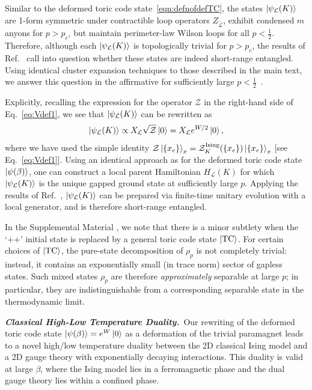 \documentclass[aps,prl,twocolumn,floatfix,nofootinbib]{revtex4-2}
\theoremstyle{definition}
\newcommand{\TC}{\text{TC}}
\begin{document}
Similar to the deformed toric code state~\eqref{eqn:defnofdefTC}, the states $\ket{\psi_{\mathcal{L}}(K)}$ are 1-form symmetric under contractible loop operators $Z_{\tilde{\mathcal{L}}}$, exhibit condensed $m$ anyons for $p > p_{c}$, but maintain perimeter-law Wilson loops for all $p < \frac{1}{2}$. Therefore, although each $\ket{\psi_{\mathcal{L}}(K)}$ is topologically trivial for $p > p_{c}$, the results of Ref.~ call into question whether these states are indeed short-range entangled. Using identical cluster expansion techniques to those described in the main text, we answer this question in the affirmative for sufficiently large $p< \frac{1}{2}$~\cite{SOM}.

Explicitly, recalling the expression for the operator $\mathcal{Z}$ in the right-hand side of Eq.~\eqref{eq:Vdef1}, we see that $\ket{\psi_{\mathcal{L}}(K)}$ can be rewritten as
\begin{equation}
    \ket{\psi_{\mathcal{L}}(K)} \propto X_{\mathcal{L}} \sqrt{\mathcal{Z}} \ket{0} = X_{\mathcal{L}} e^{W / 2} \ket{0} ,
\end{equation}
where we have used the simple identity $\mathcal{Z} \ket{\qty{x_{e}}}_{x} = \mathcal{Z}^{\text{Ising}}_{K}(\qty{x_{e}}) \ket{\qty{x_{e}}}_{x}$ [see Eq.~\eqref{eq:Vdef1}]. Using an identical approach as for the deformed toric code state $\ket{\psi(\beta)}$, one can construct a local parent Hamiltonian $H_{\mathcal{L}}(K)$ for which $\ket{\psi_{\mathcal{L}}(K)}$ is the unique gapped ground state at sufficiently large $p$. Applying the results of Ref.~\cite{Yin_Lucas_low-density_2025,DeRoeck_Khemani_low-density_2025}, $\ket{\psi_{\mathcal{L}}(K)}$ can be prepared via finite-time unitary evolution with a local generator, and is therefore short-range entangled.

In the Supplemental Material \cite{SOM}, we note that there is a minor subtlety when the `++' initial state is replaced by a general toric code state $\ket{\TC}$. For certain choices of $\ket{\TC}$, the pure-state decomposition of $\rho_{p}$ is not completely trivial: instead, it contains an exponentially small (in trace norm) sector of gapless states. Such mixed states $\rho_p$ are therefore \emph{approximately} separable at large $p$; in particular, they are indistinguishable from a corresponding separable state in the thermodynamic limit.

\textbf{\textit{Classical High-Low Temperature Duality.}}~Our rewriting of the deformed toric code state $\ket{\psi(\beta)} = e^{W} \ket{0}$ as a deformation of the trivial paramagnet leads to a novel high/low temperature duality between the 2D classical Ising model and a 2D gauge theory with exponentially decaying interactions. This duality is valid at large $\beta$, where the Ising model lies in a ferromagnetic phase and the dual gauge theory lies within a confined phase.
\end{document}
